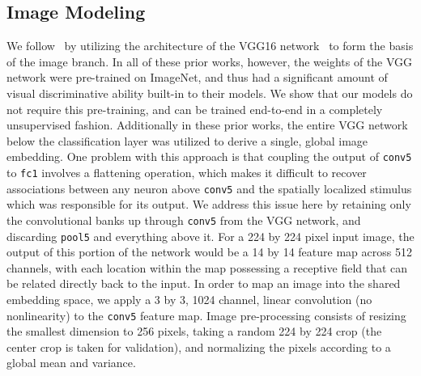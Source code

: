 \subsection{Image Modeling}
We follow~\cite{harwath_nips,harwath_acl_2017,gelderloos_2016,chrupala_2017,alishahi_2017,kamper_2017} by utilizing the architecture of the VGG16 network~\cite{vgg} to form the basis of the image branch. In all of these prior works, however, the weights of the VGG network were pre-trained on ImageNet, and thus had a significant amount of visual discriminative ability built-in to their models. We show that our models do not require this pre-training, and can be trained end-to-end in a completely unsupervised fashion. Additionally in these prior works, the entire VGG network below the classification layer was utilized to derive a single, global image embedding. One problem with this approach is that coupling the output of \texttt{conv5} to \texttt{fc1} involves a flattening operation, which makes it difficult to recover associations between any neuron above \texttt{conv5} and the spatially localized stimulus which was responsible for its output. We address this issue here by retaining only the convolutional banks up through \texttt{conv5} from the VGG network, and discarding \texttt{pool5} and everything above it. For a 224 by 224 pixel input image, the output of this portion of the network would be a 14 by 14 feature map across 512 channels, with each location within the map possessing a receptive field that can be related directly back to the input. In order to map an image into the shared embedding space, we apply a 3 by 3, 1024 channel, linear convolution (no nonlinearity) to the \texttt{conv5} feature map. Image pre-processing consists of resizing the smallest dimension to 256 pixels, taking a random 224 by 224 crop (the center crop is taken for validation), and normalizing the pixels according to a global mean and variance.  

